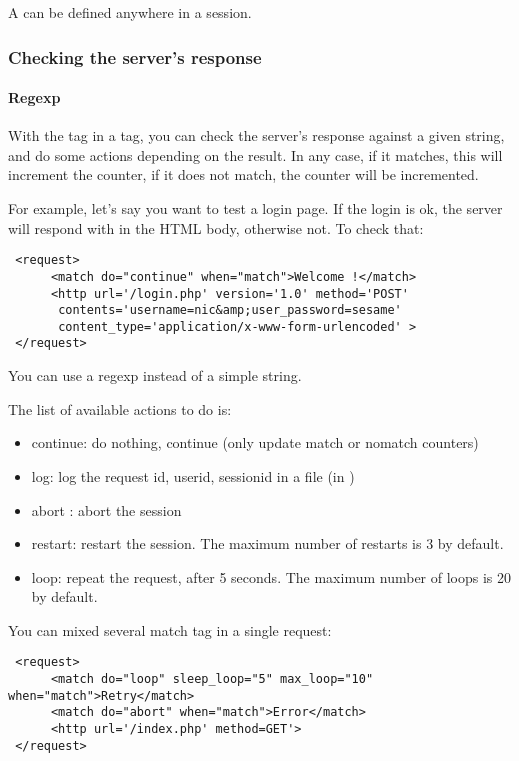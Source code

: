\documentclass{TSUNG-en}
\begin{document}
A  can be defined anywhere in a session.

\subsubsection{Checking the server's response}

\paragraph{Regexp}

With the tag  in a  tag, you can check
the server's response against a given string, and do some actions
depending on the result. In any case, if it matches, this will
increment the  counter, if it does not match, the
 counter will be incremented.

For example, let's say you want to test a login page. If the login is
ok, the server will respond with  in the
HTML body, otherwise not. To check that:
\begin{Verbatim}
 <request>
      <match do="continue" when="match">Welcome !</match>
      <http url='/login.php' version='1.0' method='POST'
       contents='username=nic&amp;user_password=sesame'
       content_type='application/x-www-form-urlencoded' >
 </request>
\end{Verbatim}

You can use a regexp instead of a simple string.

The list of available actions to do is:
\begin{itemize}
\item continue: do nothing, continue (only update match or nomatch counters)
\item log: log the request id, userid, sessionid in a file (in )
\item abort : abort the session
\item restart: restart the session. The maximum number of
  restarts is 3 by default.
\item loop: repeat the request, after 5 seconds. The maximum number of
  loops is 20 by default.
\end{itemize}

You can mixed several match tag in a single request:
\begin{Verbatim}
 <request>
      <match do="loop" sleep_loop="5" max_loop="10" when="match">Retry</match>
      <match do="abort" when="match">Error</match>
      <http url='/index.php' method=GET'>
 </request>
\end{Verbatim}
\end{document}
